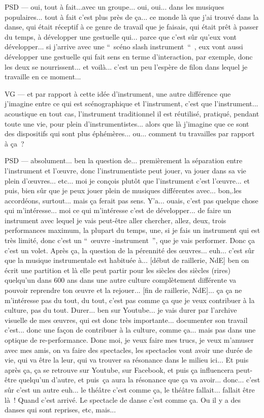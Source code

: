 PSD — oui, tout à fait...avec un groupe... oui, oui... dans les musiques populaires... tout à fait c'est plus près de ça... ce monde là que j'ai trouvé dans la danse, qui était réceptif à ce genre de travail que je faisais, qui était prêt à passer du temps, à développer une gestuelle qui... parce que c'est sûr qu'eux vont développer... si j'arrive avec une “ scéno slash instrument “ , eux vont aussi développer une gestuelle qui fait sens en terme d'interaction, par exemple, donc les deux se nourrissent... et voilà... c'est un peu l'espère de filon dans lequel je travaille en ce moment...

VG — et par rapport à cette idée d'instrument, une autre différence que j'imagine entre ce qui est scénographique et l'instrument, c'est que l'instrument... acoustique en tout cas, l'instrument traditionnel il est réutilisé, pratiqué, pendant toute une vie, pour plein d'instrumentistes... alors que là j'imagine que ce sont des dispositifs qui sont plus éphémères... ou... comment tu travailles par rapport à ça ?

PSD — absolument... ben la question de... premièrement la séparation entre l'instrument et l'œuvre, donc l'instrumentiste peut jouer, va jouer dans sa vie plein d'œuvres... etc...  moi je conçois plutôt que l'instrument c'est l'œuvre... et puis, bien sûr que je peux jouer plein de musiques différentes avec... bon,.les accordéons, surtout... mais ça ferait pas sens. Y'a... ouais, c'est pas quelque chose qui m'intéresse... moi ce qui m'intéresse c'est de développer... de faire un instrument avec lequel je vais peut-être aller chercher, allez, deux, trois performances maximum, la plupart du temps, une, si je fais un instrument qui est très limité, donc c'est un “ œuvre -instrument ”, que je vais performer. Donc ça c'est un volet. Après ça, la question de la pérennité des œuvres... euh... c'est sûr que la musique instrumentale est habituée à... [début de raillerie,  NdE] ben on écrit une partition et là elle peut partir pour les siècles des siècles (rires)  quelqu'un dans 600 ans dans une autre culture complètement différente va pouvoir reprendre ton œuvre et la rejouer... [fin de raillerie,  NdE]... ça ça ne m'intéresse pas du tout, du tout, c'est pas comme ça que je veux contribuer à la culture, pas du tout. Durer... ben sur Youtube... je vais durer par l'archive visuelle de mes œuvres, qui est donc très importante... documenter son travail c'est... donc une façon de contribuer à la culture, comme ça... mais pas dans une optique de re-performance. Donc moi, je veux faire mes trucs, je veux m'amuser avec mes amis, on va faire des spectacles, les spectacles vont avoir une durée de vie, qui va être la leur, qui va trouver sa résonance dans le milieu ici... Et puis après ça, ça se retrouve sur Youtube, sur Facebook, et puis ça influencera peut-être quelqu'un d'autre, et puis ça aura la résonance que ça va avoir... donc... c'est sûr c'est un autre euh... le théâtre c'est comme ça, le théâtre fallait... fallait être là ! Quand c'est arrivé. Le spectacle de danse c'est comme ça. Ou il y a des danses qui sont reprises, etc, mais...

